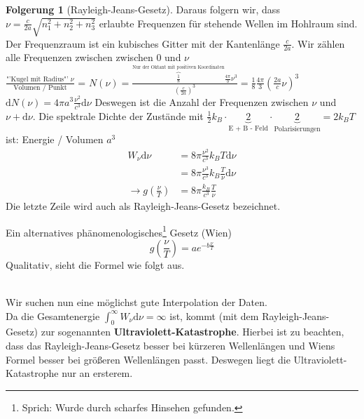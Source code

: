 \documentclass[oneside]{book}
\theoremstyle{definition}
\newtheorem*{folgerung*}{Folgerung}
\renewcommand{\d}{\mathrm d}
\begin{document}
\begin{folgerung*}[Rayleigh-Jeans-Gesetz]
Daraus folgern wir, dass $\nu = \frac{c}{2a} \sqrt{n_1^2 + n_2^2 + n_3^2}$ erlaubte Frequenzen für stehende Wellen im Hohlraum sind.\\
Der Frequenzraum ist ein kubisches Gitter mit der Kantenlänge $\frac{c}{2a}$. Wir zählen alle Frequenzen zwischen  zwischen 0 und $\nu$\\
$\frac{\text{"'Kugel mit Radius"'~}\nu}{\text{Volumen / Punkt}}$ =
$N(\nu) = \frac{\overbrace{\frac18}^
	\text{Nur der Oktant mit positiven Koordinaten} 
	\frac{4\pi}{3}\nu^3
	}{(\frac{c}{2a})^3} = \frac{1}{8} \frac{4\pi}{3}
 (\frac{2a}{c}\nu)^3$\\
$\d N(\nu) = 4 \pi a^3 \frac{\nu^2}{c^3} \d \nu$ Deswegen ist die Anzahl der Frequenzen zwischen $\nu$ und $\nu + \d \nu$. Die spektrale Dichte der Zustände mit $\frac12 k_B \cdot \underbrace{2}_{\text{E + B - Feld}} \cdot \underbrace{2}_{\text{Polarisierungen}} = 2 k_B T$ ist:
Energie / Volumen $a^3$
\begin{align*}
	W_\nu \d \nu &= 8 \pi \frac{\nu^2}{c^3} k_B T \d \nu\\
	&= 8 \pi \frac{\nu^3}{c^3} k_B \frac{T}{\nu} \d \nu\\
	\rightarrow g(\frac{\nu}{T}) &= 8 \pi \frac{k_B}{c^3} \frac{T}{\nu}
\end{align*}
Die letzte Zeile wird auch als Rayleigh-Jeans-Gesetz bezeichnet.
\begin{center}
\end{center}
\end{folgerung*}
Ein alternatives phänomenologisches\footnote{Sprich: Wurde durch scharfes Hinsehen gefunden.} Gesetz (Wien)
$$g(\frac{\nu}{T}) = a e^{- b \frac{\nu}{T}}$$
Qualitativ, sieht die Formel wie folgt aus.
\begin{center}
\end{center}~\\
Wir suchen nun eine möglichst gute Interpolation der Daten.\\
Da die Gesamtenergie $\int_0^\infty W_\nu \d \nu = \infty$ ist, kommt (mit dem Rayleigh-Jeans-Gesetz) zur sogenannten \textbf{Ultraviolett-Katastrophe}. Hierbei ist zu beachten, dass das Rayleigh-Jeans-Gesetz besser bei kürzeren Wellenlängen und Wiens Formel besser bei größeren Wellenlängen passt. Deswegen liegt die Ultraviolett-Katastrophe nur an ersterem.
\end{document}
